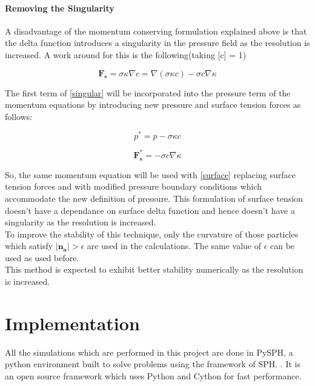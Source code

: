 \subsubsection{Removing the Singularity}

A disadvantage of the momentum conserving formulation explained above is that the delta function introduces a singularity in the pressure field as the resolution is increased. A work around for this is the following(taking [c] = 1)

\begin{equation}
 \mathbf{F_s} = \sigma \kappa \nabla c = \nabla(\sigma \kappa c) - \sigma c \nabla \kappa
\label{singular}
 \end{equation}
\noindent

The first term of \ref{singular} will be incorporated into the pressure term of the momentum equations by introducing new pressure and surface tension forces as follows:

\begin{equation}
 p^* = p - \sigma \kappa c
\end{equation}

\begin{equation}
 \mathbf{F_s^*} = - \sigma c \nabla \kappa 
 \label{surface}
\end{equation}

\noindent
So, the same momentum equation will be used with \ref{surface} replacing surface tension forces and with modified pressure boundary conditions which accommodate the new definition of pressure. This formulation of surface tension doesn't have a dependance on surface delta function and hence doesn't have a singularity as the resolution is increased.\\

To improve the stability of this technique, only the curvature of those particles which satisfy $\left | \mathbf{n_a}\right| > \epsilon$ are used in the calculations. The same value of $\epsilon$ can be used as used before. \\

This method is expected to exhibit better stability numerically as the resolution is increased. 


\chapter{Implementation}

All the simulations which are performed in this project are done in PySPH, a python environment built to solve problems using the framework of SPH. \citep{prabhu}. It is an open source framework which uses Python and Cython for fast performance. \\

